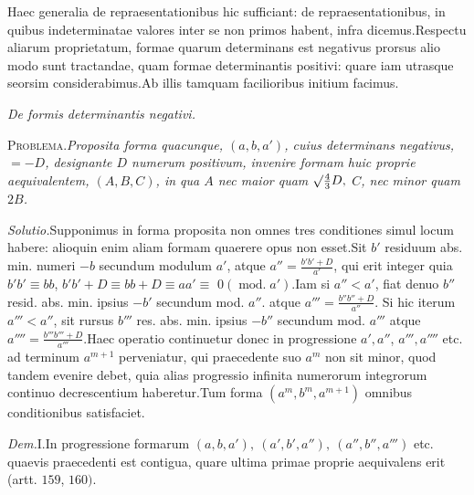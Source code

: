 Haec generalia de repraesentationibus hic sufficiant: de repraesentationibus, in quibus indeterminatae valores inter se non primos habent, infra dicemus.\quad Respectu aliarum proprietatum, formae quarum determinans est negativus prorsus alio modo sunt tractandae, quam formae determinantis positivi: quare iam utrasque seorsim considerabimus.\quad Ab illis tamquam facilioribus initium facimus.

\begin{center}\emph{De formis determinantis negativi.}\end{center}


\textsc{Problema.}\quad \emph{Proposita forma quacunque, $(a,b,a')$, cuius determinans negativus, $=-D$, designante $D$ numerum positivum, invenire formam huic proprie aequivalentem, $(A,B,C)$, in qua $A$ nec maior quam $\surd\tfrac43D,$ $C$, nec minor quam $2B$.}

\emph{Solutio.}\quad Supponimus in forma proposita non omnes tres conditiones simul locum habere: alioquin enim aliam formam quaerere opus non esset.\quad Sit $b'$ residuum abs. min. numeri $-b$ secundum modulum $a'$, atque $a''=\frac{b'b'+D}{a'}$, qui erit integer quia $b'b'\equiv bb$, $b'b'+D\equiv bb+D\equiv aa'\equiv$ $0(\operatorname{mod.}a').$\quad Iam si $a''<a'$, fiat denuo $b''$ resid. abs. min. ipsius $-b'$ secundum mod. $a''$. atque $a'''=\frac{b''b''+D}{a''}$. Si hic iterum $a'''<a''$, sit rursus $b'''$ res. abs. min. ipsius $-b''$ secundum mod. $a'''$ atque $a''''=\frac{b'''b'''+D}{a'''}$.\quad Haec operatio continuetur donec in progressione $a',a''$, $a''',a''''$ etc. ad terminum $a^{m+1}$ perveniatur, qui praecedente suo $a^m$ non sit minor, quod tandem evenire debet, quia alias progressio infinita numerorum integrorum continuo decrescentium haberetur.\quad Tum forma $(a^m,b^m,a^{m+1})$ omnibus conditionibus satisfaciet.

\emph{Dem.}\quad I.\quad In progressione formarum $(a,b,a'),\ (a',b',a''),\ (a'',b'',a''')$ etc. quaevis praecedenti est contigua, quare ultima primae proprie aequivalens erit (artt. $159$, $160).$
